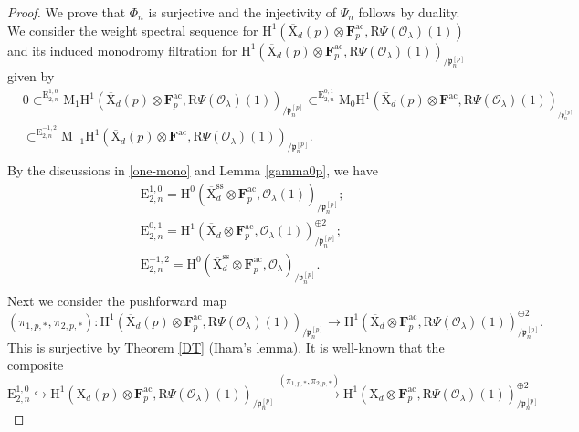 \documentclass[10pt]{amsart}
\numberwithin{equation}{section}
\theoremstyle{plain}
\numberwithin{equation}{section}
\theoremstyle{definition}
\theoremstyle{remark}
\def\ac{\mathrm{ac}}
\def\ss{\mathrm{ss}}
\def\ac{\mathrm{ac}}
\def\calO{\mathcal{O}}
\def\frakp{\mathfrak{p}}
\def\FF{\mathbf{F}}
\def\rmH{\mathrm{H}}
\def\rmE{\mathrm{E}}
\def\rmM{\mathrm{M}}
\def\rmX{\mathrm{X}}
\def\rmXbar{\overline{\rmX}}
\def\rmR{\mathrm{R}}
\begin{document}
\begin{proof}
We prove that $\Phi_{n}$ is surjective and the injectivity of $\Psi_{n}$ follows by duality. We consider the weight spectral sequence for $\rmH^{1}(\rmXbar_{d}(p)\otimes{\FF^{\ac}_{p}}, \rmR\Psi(\calO_{\lambda})(1))$ and its induced monodromy filtration for $\rmH^{1}(\rmXbar_{d}(p)\otimes{\FF^{\ac}_{p}}, \rmR\Psi(\calO_{\lambda})(1))_{/\frakp^{[p]}_{n}}$ given by
\begin{equation}\label{mono}
\begin{aligned}
&0\subset^{\rmE^{1,0}_{2,n}} \rmM_{1}\rmH^{1}(\rmXbar_{d}(p)\otimes{\FF^{\ac}_{p}},\rmR\Psi(\calO_{\lambda})(1))_{/\frakp^{[p]}_{n}}\subset^{\rmE^{0,1}_{2,n}} \rmM_{0}\rmH^{1}(\rmXbar_{d}(p)\otimes{\FF^{\ac}}, \rmR\Psi(\calO_{\lambda})(1))_{_{/\frakp^{[p]}_{n}}}\\
&\subset^{\rmE^{-1,2}_{2, n}} \rmM_{-1}\rmH^{1}(\rmXbar_{d}(p)\otimes{\FF^{\ac}}, \rmR\Psi(\calO_{\lambda})(1))_{/\frakp^{[p]}_{n}}.\\
\end{aligned}
\end{equation}
By the discussions in \ref{one-mono} and Lemma \ref{gamma0p},  we have 
\begin{equation*}
\begin{aligned}
&\rmE^{1,0}_{2,n}= \rmH^{0}(\overline{\rmX}^{\ss}_{d}\otimes{\FF^{\ac}_{p}}, \calO_{\lambda}(1))_{/\frakp^{[p]}_{n}};\\
&\rmE^{0,1}_{2, n}=\rmH^{1}(\overline{\rmX}_{d}\otimes {\FF^{\ac}_{p}},\calO_{\lambda}(1))^{\oplus 2}_{/\frakp^{[p]}_{n}};\\
&\rmE^{-1,2}_{2, n}=\rmH^{0}(\overline{\rmX}^{\ss}_{d}\otimes {\FF^{\ac}_{p}}, \calO_{\lambda})_{/\frakp^{[p]}_{n}}.\\
\end{aligned}
\end{equation*}
Next we consider the pushforward map 
\begin{equation*}
(\pi_{1,p,*}, \pi_{2,p,*}): \rmH^{1}(\rmXbar_{d}(p)\otimes{\FF^{\ac}_{p}}, \rmR\Psi(\calO_{\lambda})(1))_{/\frakp^{[p]}_{n}}\rightarrow \rmH^{1}(\rmXbar_{d}\otimes{\FF^{\ac}_{p}}, \rmR\Psi(\calO_{\lambda})(1))_{/\frakp^{[p]}_{n}}^{\oplus 2}.
\end{equation*}
This is surjective by Theorem \ref{DT} (Ihara's lemma). It is well-known that the composite 
\begin{equation*}
\rmE^{1,0}_{2,n}\hookrightarrow \rmH^{1}(\rmX_{d}(p)\otimes{\FF^{\ac}_{p}}, \rmR\Psi(\calO_{\lambda})(1))_{/\frakp^{[p]}_{n}}\xrightarrow{(\pi_{1,p,*}, \pi_{2,p,*})} \rmH^{1}(\rmX_{d}\otimes{\FF^{\ac}_{p}}, \rmR\Psi(\calO_{\lambda})(1))^{\oplus 2}_{/\frakp^{[p]}_{n}}

\end{equation*}
\end{proof}
\end{document}
